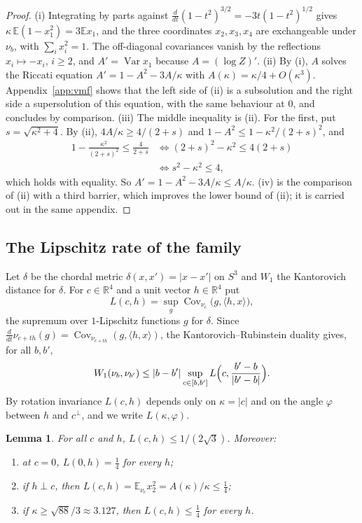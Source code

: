 \documentclass[aps,prd,twocolumn,superscriptaddress,nofootinbib,longbibliography,floatfix,amsmath,amssymb,10pt]{revtex4-2}
\newtheorem{lemma}[theorem]{Lemma}
\theoremstyle{definition}
\theoremstyle{remark}
\newcommand{\R}{\mathbb{R}}
\newcommand{\E}{\mathbb{E}}
\newcommand{\Cov}{\operatorname{Cov}}
\newcommand{\Var}{\operatorname{Var}}
\newcommand{\ip}[2]{\langle #1,#2\rangle}
\begin{document}
\begin{proof}
(i) Integrating by parts against $\frac{d}{dt}(1-t^2)^{3/2}=-3t(1-t^2)^{1/2}$
gives $\kappa\,\E(1-x_1^2)=3\E x_1$, and the three coordinates
$x_2,x_3,x_4$ are exchangeable under $\nu_b$, with $\sum_ix_i^2=1$. The
off-diagonal covariances vanish by the reflections $x_i\mapsto-x_i$,
$i\ge2$, and $A'=\Var x_1$ because $A=(\log Z)'$.
(ii) By (i), $A$ solves the Riccati equation $A'=1-A^2-3A/\kappa$ with
$A(\kappa)=\kappa/4+O(\kappa^3)$. Appendix~\ref{app:vmf} shows that the left
side of (ii) is a subsolution and the right side a supersolution of this
equation, with the same behaviour at $0$, and concludes by comparison.
(iii) The middle inequality is (ii). For the first, put $s=\sqrt{\kappa^2+4}$.
By (ii), $4A/\kappa\ge4/(2+s)$ and $1-A^2\le1-\kappa^2/(2+s)^2$, and
\[
\begin{aligned}
1-\frac{\kappa^2}{(2+s)^2}\le\frac4{2+s}
&\iff(2+s)^2-\kappa^2\le4(2+s)\\
&\iff s^2-\kappa^2\le4,
\end{aligned}
\]
which holds with equality. So $A'=1-A^2-3A/\kappa\le A/\kappa$.
(iv) is the comparison of (ii) with a third barrier, which improves the
lower bound of (ii); it is carried out in the same appendix.
\end{proof}

\subsection{The Lipschitz rate of the family}

Let $\delta$ be the chordal metric $\delta(x,x')=|x-x'|$ on $S^3$ and $W_1$
the Kantorovich distance for $\delta$. For $c\in\R^4$ and a unit vector
$h\in\R^4$ put
\begin{equation}\label{eq:rate}
L(c,h)=\sup_g\Cov_{\nu_c}\bigl(g,\ip hx\bigr),
\end{equation}
the supremum over $1$-Lipschitz functions $g$ for $\delta$. Since
$\frac{d}{dt}\nu_{c+th}(g)=\Cov_{\nu_{c+th}}(g,\ip hx)$, the
Kantorovich--Rubinstein duality gives, for all $b,b'$,
\begin{equation}\label{eq:w1segment}
W_1(\nu_b,\nu_{b'})\le|b-b'|\sup_{c\in[b,b']}L\Bigl(c,\frac{b'-b}{|b'-b|}
\Bigr).
\end{equation}
By rotation invariance $L(c,h)$ depends only on $\kappa=|c|$ and on the angle
$\varphi$ between $h$ and $c^\perp$, and we write $L(\kappa,\varphi)$.

\begin{lemma}\label{lem:rate}
For all $c$ and $h$, $L(c,h)\le1/(2\sqrt3)$. Moreover:
\begin{enumerate}[label=\textup{(\roman*)},leftmargin=*]
\item at $c=0$, $L(0,h)=\frac14$ for every $h$;
\item if $h\perp c$, then $L(c,h)=\E_{\nu_c}x_2^2=A(\kappa)/\kappa\le\frac14$;
\item if $\kappa\ge\sqrt{88}/3\approx3.127$, then $L(c,h)\le\frac14$ for
every $h$.
\end{enumerate}
\end{lemma}
\end{document}
